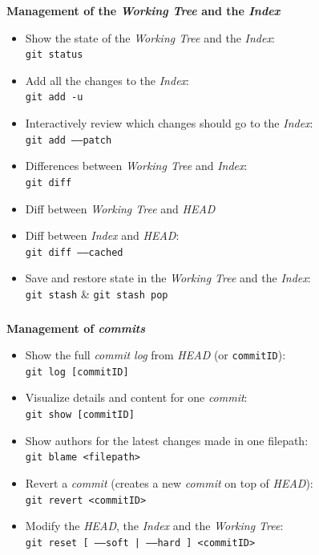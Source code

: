 \begin{frame}
  \frametitle{\insertsubsection}

  \textbf{Management of the \textit{Working Tree} and the \textit{Index}}
  \begin{itemize}
  \item Show the state of the \textit{Working Tree} and the \textit{Index}:\\
    \texttt{git status}
    \vspacing

  \item Add all the changes to the \textit{Index}:\\
    \texttt{git add -u}
    \vspacing

  \item Interactively review which changes
    should go to the \textit{Index}:\\
    \texttt{git add \---\---patch} \vspacing

  \item Differences between \textit{Working Tree} and
    \textit{Index}:\\
    \texttt{git diff}
    \vspacing
  \item Diff between \textit{Working Tree} and \textit{HEAD} \vspacing
  \item Diff between \textit{Index} and \textit{HEAD}:\\
    \texttt{git diff \---\---cached}
    \vspacing

  \item Save and restore state in the \textit{Working Tree} and the
    \textit{Index}:\\
    \texttt{git stash} \& \texttt{git stash pop}
    \vspacing
  \end{itemize}
\end{frame}

\begin{frame}[fragile]
  \frametitle{\insertsubsection}

  \textbf{Management of \textit{commits}} \\
  \begin{itemize}
  \item Show the full \textit{commit log} from
    \textit{HEAD} (or \texttt{commitID}):\\
    \texttt{git log [commitID]} \vspacing
  \item Visualize details and content for one \textit{commit}:\\
    \texttt{git show [commitID]} \vspacing
  \item Show authors for the latest changes made in one filepath:\\
    \texttt{git blame <filepath>}
    \vspacing
  \item Revert a \textit{commit} (creates a new \textit{commit} on top
    of \textit{HEAD}):\\
    \texttt{git revert <commitID>} \vspacing
  \item Modify the \textit{HEAD}, the \textit{Index}
    and the \textit{Working Tree}:\\
    \texttt{git reset [ \---\---soft | \---\---hard ] <commitID>}
    \vspacing
  \end{itemize}
\end{frame}

